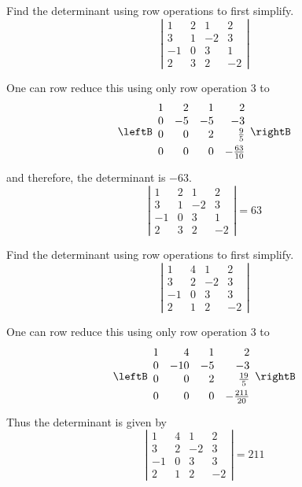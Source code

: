 \begin{enumialphparenastyle}
\begin{ex} Find the determinant using row operations to first simplify.
\begin{equation*}
\left|
\begin{array}{rrrr}
1 & 2 & 1 & 2 \\
3 & 1 & -2 & 3 \\
-1 & 0 & 3 & 1 \\
2 & 3 & 2 & -2
\end{array}
\right|
\end{equation*}
\begin{sol}
One can row reduce this using only row operation 3 to
\[
\leftB 
\begin{array}{rrrr}
1 & 2 & 1 & 2 \\
0 & -5 & -5 & -3 \\
0 & 0 & 2 & \vspace{0.05in}\frac{9}{5} \\
0 & 0 & 0 & -\vspace{0.05in}\frac{63}{10}
\end{array}
\rightB
\]
and therefore, the determinant is $-63.$
\[
\left|
\begin{array}{rrrr}
1 & 2 & 1 & 2 \\
3 & 1 & -2 & 3 \\
-1 & 0 & 3 & 1 \\
2 & 3 & 2 & -2
\end{array}
\right| = 63
\]
\end{sol}
\end{ex}

\begin{ex} Find the determinant using row operations to first simplify. 
\begin{equation*}
\left|
\begin{array}{rrrr}
1 & 4 & 1 & 2 \\
3 & 2 & -2 & 3 \\
-1 & 0 & 3 & 3 \\
2 & 1 & 2 & -2
\end{array}
\right|
\end{equation*}
\begin{sol}
One can row reduce this using only row operation 3 to$\allowbreak $%
\[
\leftB
\begin{array}{rrrr}
1 & 4 & 1 & 2 \\
0 & -10 & -5 & -3 \\
0 & 0 & 2 & \vspace{0.05in}\frac{19}{5} \\
0 & 0 & 0 & -\vspace{0.05in}\frac{211}{20}
\end{array}
\rightB
\]
Thus the determinant is given by
\[
\left|
\begin{array}{rrrr}
1 & 4 & 1 & 2 \\
3 & 2 & -2 & 3 \\
-1 & 0 & 3 & 3 \\
2 & 1 & 2 & -2
\end{array}
\right| = 211
\]
\end{sol}
\end{ex}

\end{enumialphparenastyle}